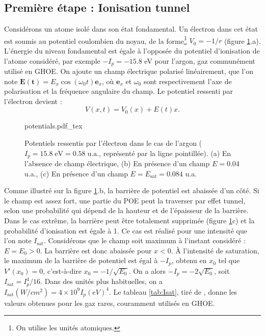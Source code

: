 \subsection{Première étape : Ionisation tunnel}
Considérons un atome isolé dans son état fondamental. Un électron dans cet état est soumis au potentiel coulombien du noyau, de la forme\footnote{On utilise les unités atomiques.} $V_0 = -1/r$ (figure \ref{fig:ionization}.a). L'énergie du niveau fondamental est égale à l'opposée du potentiel d'ionisation de l'atome considéré, par exemple $-I_p=-15.8$ eV pour l'argon, gaz communément utilisé en GHOE. On ajoute un champ électrique polarisé linéairement, que l'on note $\bm{E(t)} = E_x \cos(\omega_0 t)\bm{e}_x$, où $\bm{e}_x$ et $\omega_0$ sont respectivement l'axe de polarisation et la fréquence angulaire du champ. Le potentiel ressenti par l'électron devient :
\begin{equation}
V(x,t) = V_0(x) + E(t)x.
\end{equation} 

\begin{figure}[!ht]
\centering
\def\svgwidth{\columnwidth}
{potentials.pdf_tex}
\caption{Potentiels ressentis par l'électron dans le cas de l'argon ($I_p = 15.8\; \text{eV} = 0.58\; \text{u.a.}$, représenté par la ligne pointillée). (a) En l'absence de champ électrique, (b) En présence d'un champ $E=0.04$ u.a., (c) En présence d'un champ $E=E_{\text{sat}}=0.084$ u.a.}
\label{fig:ionization}
\end{figure}

Comme illustré sur la figure \ref{fig:ionization}.b, la barrière de potentiel est abaissée d'un côté. Si le champ est assez fort, une partie du POE peut la traverser par effet tunnel, selon une probabilité qui dépend de la hauteur et de l'épaisseur de la barrière. Dans le cas extrême, la barrière peut être totalement supprimée (figure \ref{fig:ionization}c) et la probabilité d'ionisation est égale à 1. Ce cas est réalisé pour une intensité que l'on note $I_\text{sat}$. Considérons que le champ soit maximum à l'instant considéré : $E=E_0>0$. La barrière est donc abaissée pour $x<0$. \`A l'intensité de saturation, le maximum de la barrière de potentiel est égal à $-I_p$, obtenu en $x_0$ tel que $V'(x_0) = 0$, c'est-à-dire $x_0 = -1/\sqrt{E_0}$. On a alors $-I_p = -2\sqrt{E_0}$, soit $I_\text{sat} = I_p^4/16$. Dans des unités plus habituelles, on a $I_\text{sat}(\si{W/cm^2}) = 4\times10^9I_p(\si{eV})^4$. Le tableau \ref{tab:Isat}, tiré de , donne les valeurs obtenues pour les gaz rares, couramment utilisés en GHOE.


